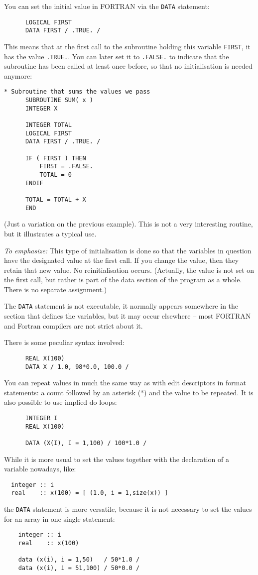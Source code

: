 You can set the initial value in FORTRAN via the \verb+DATA+ statement:
%
\begin{verbatim}
      LOGICAL FIRST
      DATA FIRST / .TRUE. /
\end{verbatim}

This means that at the first call to the subroutine holding this variable
\verb+FIRST+, it has the value \verb+.TRUE.+. You can later set it to
\verb+.FALSE.+ to indicate that the subroutine has been called at least once
before, so that no initialisation is needed anymore:
%
\begin{verbatim}
* Subroutine that sums the values we pass
      SUBROUTINE SUM( x )
      INTEGER X

      INTEGER TOTAL
      LOGICAL FIRST
      DATA FIRST / .TRUE. /

      IF ( FIRST ) THEN
          FIRST = .FALSE.
          TOTAL = 0
      ENDIF

      TOTAL = TOTAL + X
      END
\end{verbatim}
(Just a variation on the previous example). This is not a very interesting routine,
but it illustrates a typical use.

\emph{To emphasize:} This type of initialisation is done so that the variables
in question have the designated value at the first call. If you change
the value, then they retain that new value. No reinitialisation occurs.
(Actually, the value is not set on the first call, but rather is part
of the data section of the program as a whole. There is no separate
assignment.)

The \verb+DATA+ statement is not executable, it normally appears
somewhere in the section that defines the variables, but it may occur
elsewhere -- most FORTRAN and Fortran compilers are not strict about it.

There is some peculiar syntax involved:
%
\begin{verbatim}
      REAL X(100)
      DATA X / 1.0, 98*0.0, 100.0 /
\end{verbatim}

You can repeat values in much the same way as with edit descriptors
in format statements: a count followed by an asterisk (*) and the value
to be repeated. It is also possible to use implied do-loops:
%
\begin{verbatim}
      INTEGER I
      REAL X(100)

      DATA (X(I), I = 1,100) / 100*1.0 /
\end{verbatim}

While it is more usual to set the values together with the declaration
of a variable nowadays, like:
%
\begin{verbatim}
  integer :: i
  real    :: x(100) = [ (1.0, i = 1,size(x)) ]
\end{verbatim}
\noindent the \verb+DATA+ statement is more versatile, because it is
not necessary to set the values for an array in one single statement:
%
\begin{verbatim}
    integer :: i
    real    :: x(100)

    data (x(i), i = 1,50)   / 50*1.0 /
    data (x(i), i = 51,100) / 50*0.0 /
\end{verbatim}

